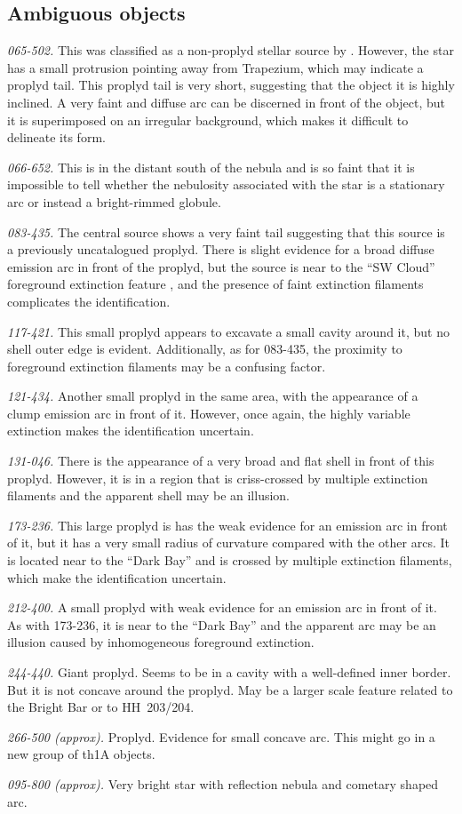 \documentclass[iop, apj]{emulateapj}
\begin{document}
\subsection{Ambiguous objects}
\label{sec:problematic-objects}

\textit{065-502.} This was classified as a non-proplyd stellar source
by \citet{ODell:1996a}. However, the star has a small protrusion
pointing away from Trapezium, which may indicate a proplyd tail. This
proplyd tail is very short, suggesting that the object it is highly
inclined.  A very faint and diffuse arc can be discerned in front of
the object, but it is superimposed on an irregular background, which
makes it difficult to delineate its form.

\textit{066-652.}  This is in the distant south of the nebula and is
so faint that it is impossible to tell whether the nebulosity
associated with the star is a stationary arc or instead a
bright-rimmed globule. 

\textit{083-435.} The central source shows a very faint tail
suggesting that this source is a previously uncatalogued proplyd.
There is slight evidence for a broad diffuse emission arc in front of
the proplyd, but the source is near to the ``SW Cloud'' foreground
extinction feature \citep{ODell:2000a}, and the presence of faint
extinction filaments complicates the identification.


\textit{117-421.} This small proplyd \citep{Ricci:2008a} appears to
excavate a small cavity around it, but no shell outer edge is
evident.  Additionally, as for 083-435, the proximity to foreground
extinction filaments may be a confusing factor. 

\textit{121-434.}  Another small proplyd in the same area, with the
appearance of a clump emission arc in front of it.  However, once
again, the highly variable extinction makes the identification
uncertain. 

\textit{131-046.}  There is the appearance of a very broad and flat
shell in front of this proplyd.  However, it is in a region that is
criss-crossed by multiple extinction filaments and the apparent shell
may be an illusion. 


\textit{173-236.} This large proplyd is has the weak evidence for an
emission arc in front of it, but it has a very small radius of
curvature compared with the other arcs.  It is located near to the
``Dark Bay'' \citep{ODell:2000a} and is crossed by multiple extinction
filaments, which make the identification uncertain.

\textit{212-400.}  A small proplyd with weak evidence for an emission
arc in front of it.  As with 173-236, it is near to the ``Dark Bay''
and the apparent arc may be an illusion caused by inhomogeneous
foreground extinction.

\textit{244-440.} Giant proplyd.  Seems to be in a cavity with a
well-defined inner border.  But it is not concave around the proplyd.
May be a larger scale feature related to the Bright Bar or to
HH~203/204.

\textit{266-500 (approx).} Proplyd. Evidence for small concave arc.
This might go in a new group of th1A objects.

\textit{095-800 (approx).} Very bright star with reflection nebula and
cometary shaped arc. 
\end{document}
